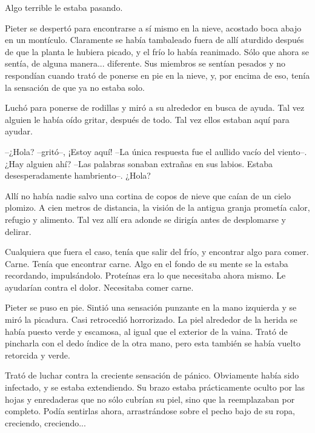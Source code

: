 Algo terrible le estaba pasando.



Pieter se despertó para encontrarse a sí mismo en la nieve, acostado boca abajo en un montículo. Claramente se había tambaleado fuera de allí aturdido después de que la planta le hubiera picado, y el frío lo había reanimado. Sólo que ahora se sentía, de alguna manera... diferente. Sus miembros se sentían pesados y no respondían cuando trató de ponerse en pie en la nieve, y, por encima de eso, tenía la sensación de que ya no estaba solo.



Luchó para ponerse de rodillas y miró a su alrededor en busca de ayuda. Tal vez alguien le había oído gritar, después de todo. Tal vez ellos estaban aquí para ayudar.



--¿Hola? --gritó--, ¡Estoy aquí! --La única respuesta fue el aullido vacío del viento--. ¿Hay alguien ahí? --Las palabras sonaban extrañas en sus labios. Estaba desesperadamente hambriento--. ¿Hola?



Allí no había nadie salvo una cortina de copos de nieve que caían de un cielo plomizo. A cien metros de distancia, la visión de la antigua granja prometía calor, refugio y alimento. Tal vez allí era adonde se dirigía antes de desplomarse y delirar.



Cualquiera que fuera el caso, tenía que salir del frío, y encontrar algo para comer. Carne. Tenía que encontrar carne. Algo en el fondo de su mente se la estaba recordando, impulsándolo. Proteínas era lo que necesitaba ahora mismo. Le ayudarían contra el dolor. Necesitaba comer carne.



Pieter se puso en pie. Sintió una sensación punzante en la mano izquierda y se miró la picadura. Casi retrocedió horrorizado. La piel alrededor de la herida se había puesto verde y escamosa, al igual que el exterior de la vaina. Trató de pincharla con el dedo índice de la otra mano, pero esta también se había vuelto retorcida y verde.



Trató de luchar contra la creciente sensación de pánico. Obviamente había sido infectado, y se estaba extendiendo. Su brazo estaba prácticamente oculto por las hojas y enredaderas que no sólo cubrían su piel, sino que la reemplazaban por completo. Podía sentirlas ahora, arrastrándose sobre el pecho bajo de su ropa, creciendo, creciendo...



